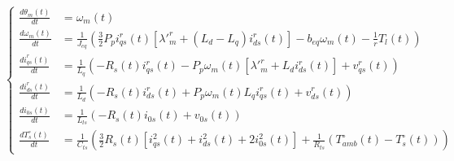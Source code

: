 \documentclass[a4paper, 10pt, onecolumn,journal]{ieeeconf}
\begin{document}
\begin{equation}
    \begin{cases} 
        \frac{d \theta_m(t)}{dt}  &= \omega_m(t)\\ 
        \frac{d \omega_m(t)}{dt}  &= \frac{1}{J_{eq}}\left(\frac{3}{2} P_p i^r_{qs}(t)\left[\lambda'^r_m + (L_d - L_q) i^r_{ds}(t) \right] - b_{eq}\omega_m(t) - \frac{1}{r}T_l(t)\right)\\ 
        \frac{d i^r_{qs}(t)}{dt}  &= \frac{1}{L_{q}}\left(-R_s(t) i^r_{qs}(t)- P_p \omega_m(t) \left[\lambda'^r_m + L_d i^r_{ds}(t)\right] + v^r_{qs}(t)\right)\\ 
        \frac{d i^r_{ds}(t)}{dt}  &= \frac{1}{L_{d}}\left(-R_s(t) i^r_{ds}(t) + P_p \omega_m(t) L_q i^r_{qs}(t)  + v^r_{ds}(t)\right)\\ 
        \frac{d i_{0s}(t)}{dt}    &= \frac{1}{L_{ls}}\left(-R_s(t) i_{0s}(t) + v_{0s}(t)\right) \\ 
        \frac{d T^\circ_s(t)}{dt} &= \frac{1}{C_{ts}}\left(\frac{3}{2} R_s(t) \left[ i_{qs}^2(t) + i_{ds}^2(t) + 2 i_{0s}^2(t) \right] + \frac{1}{R_{ts}}\left(T^{\circ}_{amb}(t) - T_s^{\circ}(t)\right)\right)
    \end{cases}
    \label{ecuacion vectorial de estado del sistema no matricial}
\end{equation}
\end{document}
